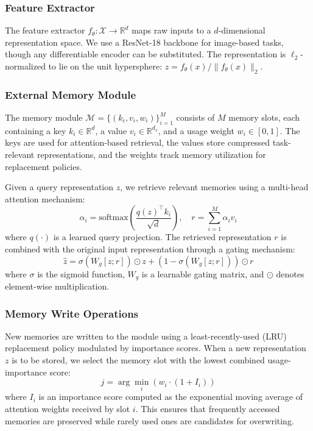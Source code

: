 \documentclass[11pt]{article}
\begin{document}
\subsubsection{Feature Extractor}

The feature extractor $f_\theta: \mathcal{X} \rightarrow \mathbb{R}^d$ maps raw inputs to a $d$-dimensional representation space. We use a ResNet-18 backbone \citep{he2016deep} for image-based tasks, though any differentiable encoder can be substituted. The representation is $\ell_2$-normalized to lie on the unit hypersphere: $z = f_\theta(x) / \|f_\theta(x)\|_2$.

\subsubsection{External Memory Module}

The memory module $\mathcal{M} = \{(k_i, v_i, w_i)\}_{i=1}^{M}$ consists of $M$ memory slots, each containing a key $k_i \in \mathbb{R}^d$, a value $v_i \in \mathbb{R}^{d_v}$, and a usage weight $w_i \in [0, 1]$. The keys are used for attention-based retrieval, the values store compressed task-relevant representations, and the weights track memory utilization for replacement policies.

Given a query representation $z$, we retrieve relevant memories using a multi-head attention mechanism:
\begin{equation}
    \alpha_i = \text{softmax}\left(\frac{q(z)^\top k_i}{\sqrt{d}}\right), \quad r = \sum_{i=1}^{M} \alpha_i v_i
\end{equation}
where $q(\cdot)$ is a learned query projection. The retrieved representation $r$ is combined with the original input representation through a gating mechanism:
\begin{equation}
    \hat{z} = \sigma(W_g [z; r]) \odot z + (1 - \sigma(W_g [z; r])) \odot r
\end{equation}
where $\sigma$ is the sigmoid function, $W_g$ is a learnable gating matrix, and $\odot$ denotes element-wise multiplication.

\subsubsection{Memory Write Operations}

New memories are written to the module using a least-recently-used (LRU) replacement policy modulated by importance scores. When a new representation $z$ is to be stored, we select the memory slot with the lowest combined usage-importance score:
\begin{equation}
    j = \arg\min_i \left( w_i \cdot (1 + I_i) \right)
\end{equation}
where $I_i$ is an importance score computed as the exponential moving average of attention weights received by slot $i$. This ensures that frequently accessed memories are preserved while rarely used ones are candidates for overwriting.
\end{document}
